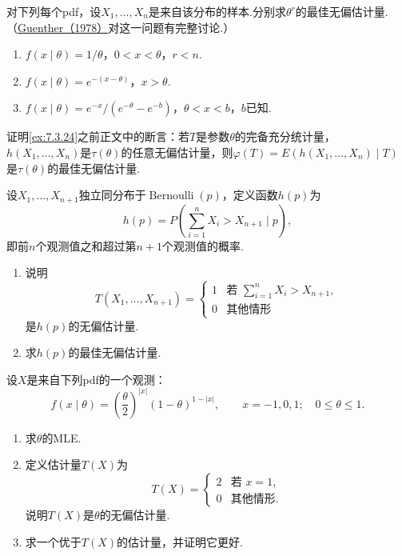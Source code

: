 \begin{exercise}\label{exercise:7.55}
对下列每个pdf，设$X_1,\ldots,X_n$是来自该分布的样本.分别求$\theta^r$的最佳无偏估计量.（\hyperref[bib:source153]{Guenther（1978）}对这一问题有完整讨论.）
\begin{enumerate}[label=(\alph*)]
\item $f(x\mid\theta)=1/\theta$，$0<x<\theta$，$r<n$.
\item $f(x\mid\theta)=e^{-(x-\theta)}$，$x>\theta$.
\item $f(x\mid\theta)=e^{-x}/(e^{-\theta}-e^{-b})$，$\theta<x<b$，$b$已知.
\end{enumerate}
\end{exercise}
\begin{exercise}\label{exercise:7.56}
证明\autoref{ex:7.3.24}之前正文中的断言：若$T$是参数$\theta$的完备充分统计量，$h(X_1,\ldots,X_n)$是$\tau(\theta)$的任意无偏估计量，则$\varphi(T)=E(h(X_1,\ldots,X_n)\mid T)$是$\tau(\theta)$的最佳无偏估计量.
\end{exercise}
\begin{exercise}\label{exercise:7.57}
设$X_1,\ldots,X_{n+1}$独立同分布于$\operatorname{Bernoulli}(p)$，定义函数$h(p)$为
$$h(p)=P\left(\sum_{i=1}^nX_i>X_{n+1}\mid p\right),$$
即前$n$个观测值之和超过第$n+1$个观测值的概率.
\begin{enumerate}[label=(\alph*)]
\item 说明
$$T(X_1,\ldots,X_{n+1})=\begin{cases}1&\text{若 }\sum_{i=1}^nX_i>X_{n+1},\\0&\text{其他情形}\end{cases}$$
是$h(p)$的无偏估计量.
\item 求$h(p)$的最佳无偏估计量.
\end{enumerate}
\end{exercise}
\begin{exercise}\label{exercise:7.58}
设$X$是来自下列pdf的一个观测：
$$f(x\mid\theta)=\left(\frac\theta2\right)^{|x|}(1-\theta)^{1-|x|},\qquad x=-1,0,1;\quad0\le\theta\le1.$$
\begin{enumerate}[label=(\alph*)]
\item 求$\theta$的MLE.
\item 定义估计量$T(X)$为
$$T(X)=\begin{cases}2&\text{若 }x=1,\\0&\text{其他情形}.\end{cases}$$
说明$T(X)$是$\theta$的无偏估计量.
\item 求一个优于$T(X)$的估计量，并证明它更好.
\end{enumerate}
\end{exercise}
